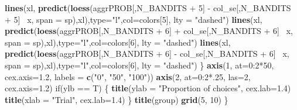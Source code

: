 \documentclass[11pt,,]{article}
\newenvironment{Shaded}{\begin{snugshade}}{\end{snugshade}}
\newcommand{\KeywordTok}[1]{\textcolor[rgb]{0.13,0.29,0.53}{\textbf{{#1}}}}
\newcommand{\DataTypeTok}[1]{\textcolor[rgb]{0.13,0.29,0.53}{{#1}}}
\newcommand{\DecValTok}[1]{\textcolor[rgb]{0.00,0.00,0.81}{{#1}}}
\newcommand{\FloatTok}[1]{\textcolor[rgb]{0.00,0.00,0.81}{{#1}}}
\newcommand{\StringTok}[1]{\textcolor[rgb]{0.31,0.60,0.02}{{#1}}}
\newcommand{\NormalTok}[1]{{#1}}
\begin{document}
\begin{Shaded}
\begin{Highlighting}[]
{        \KeywordTok{lines}\NormalTok{(xl, }\KeywordTok{predict}\NormalTok{(}\KeywordTok{loess}\NormalTok{(aggrPROB[,N_BANDITS +}\StringTok{ }\DecValTok{5}\NormalTok{] -}\StringTok{ }\NormalTok{col_se[,N_BANDITS +}\StringTok{ }\DecValTok{5}\NormalTok{] ~x, }
                                \DataTypeTok{span =} \NormalTok{sp),xl),}\DataTypeTok{type=}\StringTok{"l"}\NormalTok{,}\DataTypeTok{col=}\NormalTok{colors[}\DecValTok{5}\NormalTok{], }\DataTypeTok{lty =} \StringTok{"dashed"}\NormalTok{)}
        \KeywordTok{lines}\NormalTok{(xl, }\KeywordTok{predict}\NormalTok{(}\KeywordTok{loess}\NormalTok{(aggrPROB[,N_BANDITS +}\StringTok{ }\DecValTok{6}\NormalTok{] +}\StringTok{ }\NormalTok{col_se[,N_BANDITS +}\StringTok{ }\DecValTok{6}\NormalTok{] ~x, }
                                \DataTypeTok{span =} \NormalTok{sp),xl),}\DataTypeTok{type=}\StringTok{"l"}\NormalTok{,}\DataTypeTok{col=}\NormalTok{colors[}\DecValTok{6}\NormalTok{], }\DataTypeTok{lty =} \StringTok{"dashed"}\NormalTok{)}
        \KeywordTok{lines}\NormalTok{(xl, }\KeywordTok{predict}\NormalTok{(}\KeywordTok{loess}\NormalTok{(aggrPROB[,N_BANDITS +}\StringTok{ }\DecValTok{6}\NormalTok{] -}\StringTok{ }\NormalTok{col_se[,N_BANDITS +}\StringTok{ }\DecValTok{6}\NormalTok{] ~x, }
                                \DataTypeTok{span =} \NormalTok{sp),xl),}\DataTypeTok{type=}\StringTok{"l"}\NormalTok{,}\DataTypeTok{col=}\NormalTok{colors[}\DecValTok{6}\NormalTok{], }\DataTypeTok{lty =} \StringTok{"dashed"}\NormalTok{)}
    \NormalTok{\}}
    \KeywordTok{axis}\NormalTok{(}\DecValTok{1}\NormalTok{,  }\DataTypeTok{at=}\DecValTok{0}\NormalTok{:}\DecValTok{2}\NormalTok{*}\DecValTok{50}\NormalTok{, }\DataTypeTok{cex.axis=}\FloatTok{1.2}\NormalTok{, }\DataTypeTok{labels =} \KeywordTok{c}\NormalTok{(}\StringTok{"0"}\NormalTok{, }\StringTok{"50"}\NormalTok{, }\StringTok{"100"}\NormalTok{)) }
    \KeywordTok{axis}\NormalTok{(}\DecValTok{2}\NormalTok{,  }\DataTypeTok{at=}\DecValTok{0}\NormalTok{:}\DecValTok{2}\NormalTok{*.}\DecValTok{25}\NormalTok{,  }\DataTypeTok{las=}\DecValTok{2}\NormalTok{,  }\DataTypeTok{cex.axis=}\FloatTok{1.2}\NormalTok{)  }
    \NormalTok{if(ylb ==}\StringTok{ }\NormalTok{T) \{}
        \KeywordTok{title}\NormalTok{(}\DataTypeTok{ylab =} \StringTok{"Proportion of choices"}\NormalTok{,  }\DataTypeTok{cex.lab=}\FloatTok{1.4}\NormalTok{)}
        \KeywordTok{title}\NormalTok{(}\DataTypeTok{xlab =} \StringTok{"Trial"}\NormalTok{,  }\DataTypeTok{cex.lab=}\FloatTok{1.4}\NormalTok{)}
    \NormalTok{\}}
    \KeywordTok{title}\NormalTok{(group)}
    \KeywordTok{grid}\NormalTok{(}\DecValTok{5}\NormalTok{, }\DecValTok{10}\NormalTok{)}
\NormalTok{\}}

}
\end{Highlighting}
\end{Shaded}
\end{document}
